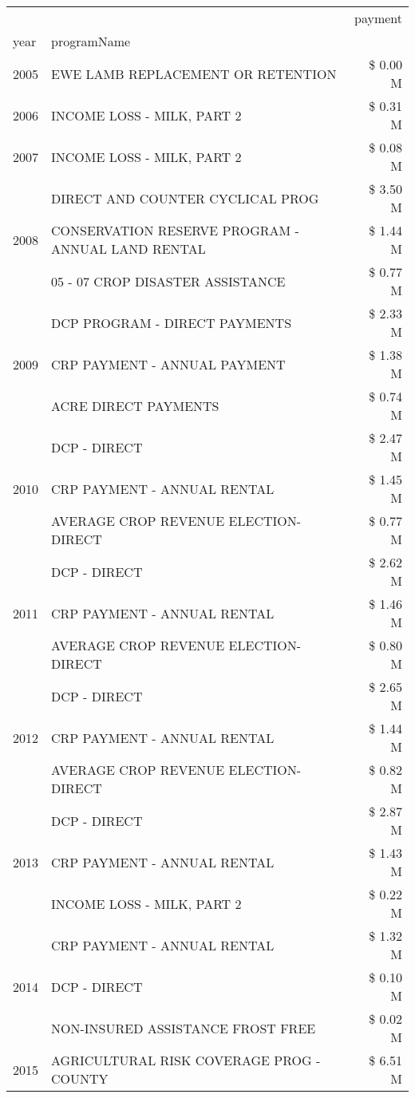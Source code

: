 \begin{tabular}{llr}
\toprule
 &  & payment \\
year & programName &  \\
\midrule
2005 & EWE LAMB REPLACEMENT OR RETENTION & \$ 0.00 M \\
\cline{1-3}
2006 & INCOME LOSS - MILK, PART 2 & \$ 0.31 M \\
\cline{1-3}
2007 & INCOME LOSS - MILK, PART 2 & \$ 0.08 M \\
\cline{1-3}
\multirow[t]{3}{*}{2008} & DIRECT AND COUNTER CYCLICAL PROG & \$ 3.50 M \\
 & CONSERVATION RESERVE PROGRAM - ANNUAL LAND RENTAL & \$ 1.44 M \\
 & 05 - 07 CROP DISASTER ASSISTANCE & \$ 0.77 M \\
\cline{1-3}
\multirow[t]{3}{*}{2009} & DCP PROGRAM - DIRECT PAYMENTS & \$ 2.33 M \\
 & CRP PAYMENT - ANNUAL PAYMENT & \$ 1.38 M \\
 & ACRE DIRECT PAYMENTS & \$ 0.74 M \\
\cline{1-3}
\multirow[t]{3}{*}{2010} & DCP - DIRECT & \$ 2.47 M \\
 & CRP PAYMENT - ANNUAL RENTAL & \$ 1.45 M \\
 & AVERAGE CROP REVENUE ELECTION-DIRECT & \$ 0.77 M \\
\cline{1-3}
\multirow[t]{3}{*}{2011} & DCP - DIRECT & \$ 2.62 M \\
 & CRP PAYMENT - ANNUAL RENTAL & \$ 1.46 M \\
 & AVERAGE CROP REVENUE ELECTION-DIRECT & \$ 0.80 M \\
\cline{1-3}
\multirow[t]{3}{*}{2012} & DCP - DIRECT & \$ 2.65 M \\
 & CRP PAYMENT - ANNUAL RENTAL & \$ 1.44 M \\
 & AVERAGE CROP REVENUE ELECTION-DIRECT & \$ 0.82 M \\
\cline{1-3}
\multirow[t]{3}{*}{2013} & DCP - DIRECT & \$ 2.87 M \\
 & CRP PAYMENT - ANNUAL RENTAL & \$ 1.43 M \\
 & INCOME LOSS - MILK, PART 2 & \$ 0.22 M \\
\cline{1-3}
\multirow[t]{3}{*}{2014} & CRP PAYMENT - ANNUAL RENTAL & \$ 1.32 M \\
 & DCP - DIRECT & \$ 0.10 M \\
 & NON-INSURED ASSISTANCE FROST FREE & \$ 0.02 M \\
\cline{1-3}
\multirow[t]{3}{*}{2015} & AGRICULTURAL RISK COVERAGE PROG - COUNTY & \$ 6.51 M \\

\end{tabular}
